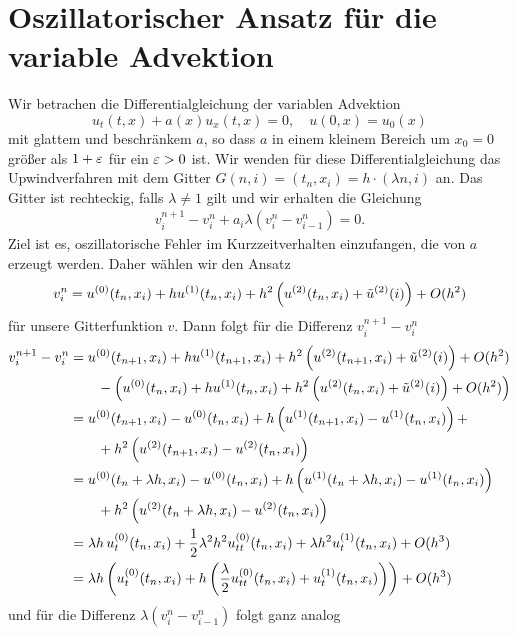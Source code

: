 \section{Oszillatorischer Ansatz für die variable Advektion}
\label{section:varadv}

Wir betrachen die Differentialgleichung der variablen Advektion
\[ 
u_t(t,x) + a(x) u_x(t,x) = 0, \quad u(0,x) = u_0(x)
\]
mit glattem und beschränkem $a$, so dass $a$ in einem kleinem Bereich um $x_0=0$ größer als $1+\varepsilon$ für ein $\varepsilon > 0$ ist.
Wir wenden für diese Differentialgleichung das Upwindverfahren mit dem Gitter $G(n,i) = (t_n, x_i) = h \cdot (\lambda n,i)$ an.
Das Gitter ist rechteckig, falls $\lambda \neq 1$ gilt und wir erhalten die Gleichung
\begin{align}\label{eq:varadv:verfahren}
v^{n+1}_i - v^n_i + a_i \lambda \left( v^n_i - v^n_{i-1} \right) = 0.
\end{align}
Ziel ist es, oszillatorische Fehler im Kurzzeitverhalten einzufangen, die von $a$ erzeugt werden.
Daher wählen wir den Ansatz
\begin{align}\label{eq:varadv:ansatz}
v^n_i = u^{(0)}(t_n, x_i) + h u^{(1)}(t_n, x_i) + h^2 \left( u^{(2)}(t_n, x_i) + \tilde u^{(2)}(i) \right) + O(h^2)
\end{align}
für unsere Gitterfunktion $v$. 
Dann folgt für die Differenz $v^{n+1}_i - v^n_i$
\begin{align*}
v^{n+1}_i - v^n_i
&= u^{(0)}(t_{n+1}, x_i) + h u^{(1)}(t_{n+1}, x_i) + h^2 \left( u^{(2)}(t_{n+1}, x_i) + \tilde u^{(2)}(i) \right) + O(h^2)\\
   &\qquad - \left( u^{(0)}(t_n, x_i) + h u^{(1)}(t_n, x_i) + h^2 \left( u^{(2)}(t_n, x_i) + \tilde u^{(2)}(i)\right)  + O(h^2)\right)\\
&= u^{(0)}(t_{n+1}, x_i) - u^{(0)}(t_n, x_i) + h \left( u^{(1)}(t_{n+1}, x_i) - u^{(1)}(t_n, x_i)\right) + \\
   &\qquad + h^2 \left( u^{(2)}(t_{n+1}, x_i) - u^{(2)}(t_n, x_i) \right)\\
&= u^{(0)}(t_n + \lambda h, x_i) - u^{(0)}(t_n, x_i) + h \left( u^{(1)}(t_n + \lambda h, x_i) - u^{(1)}(t_n, x_i)\right)\\
   &\qquad + h^2 \left( u^{(2)}(t_n + \lambda h, x_i) - u^{(2)}(t_n, x_i) \right)\\
&= \lambda h \, u^{(0)}_t (t_n, x_i) + \frac 12 \lambda^2 h^2 u^{(0)}_{tt}(t_n, x_i) + \lambda h^2 u^{(1)}_t(t_n, x_i) + O(h^3)\\
&= \lambda h \left( u^{(0)}_t (t_n, x_i) + h \left( \frac \lambda 2 u^{(0)}_{tt}(t_n, x_i) + u^{(1)}_t(t_n, x_i) \right) \right) + O(h^3)
\end{align*}
und für die Differenz $\lambda (v^n_{i} - v^n_{i-1})$ folgt ganz analog
